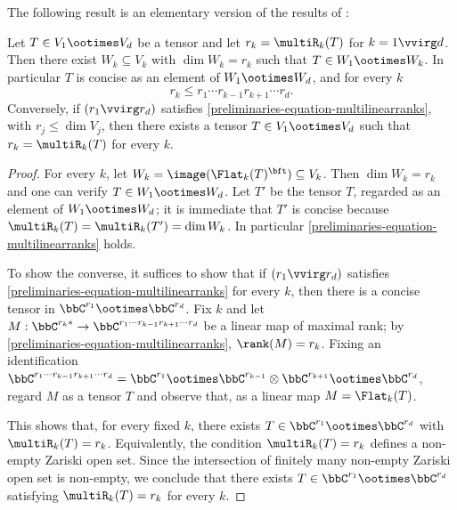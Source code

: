 The following result is an elementary version of the results of \cite{CK11}:
\begin{lemma}
\label{preliminaries-lemma-multilinearranksineq}
 Let $T \in V_1 \ootimes V_d$ be a tensor and let $r_k = \multiR_k(T)$ for $k=1 \vvirg d$. Then there exist $W_k \subseteq V_k$ with $\dim W_k = r_k$ such that $T \in W_1 \ootimes W_k$. In particular $T$ is concise as an element of $W_1 \ootimes W_d$, and for every $k$
 \begin{equation}
  \label{preliminaries-equation-multilinearranks}
 r_k \leq r_1 \cdots r_{k-1} r_{k+1} \cdots r_d.
 \end{equation}
Conversely, if $(r_1 \vvirg r_d)$ satisfies \ref{preliminaries-equation-multilinearranks}, with $r_j \leq \dim V_j$, then there exists a tensor $T \in V_1 \ootimes V_d$ such that $r_k = \multiR_k(T)$ for every $k$.
\end{lemma}
\begin{proof}
For every $k$, let $W_k = \image (  \Flat_k(T)^\bft ) \subseteq V_k$. Then $\dim W_k = r_k$ and one can verify $T \in W_1 \ootimes W_d$. Let $T'$ be the tensor $T$, regarded as an element of $W_1 \ootimes W_d$; it is immediate that $T'$ is concise because $\multiR_k(T) = \multiR_k(T') = \dim W_k$. In particular \ref{preliminaries-equation-multilinearranks} holds.

To show the converse, it suffices to show that if $(r_1 \vvirg r_d)$ satisfies \ref{preliminaries-equation-multilinearranks} for every $k$, then there is a concise tensor in $\bbC^{r_1} \ootimes \bbC^{r_d}$. Fix $k$ and let $M : \bbC^{r_k *} \to \bbC^{r_1 \cdots r_{k-1}r_{k+1} \cdots r_d}$ be a linear map of maximal rank; by \ref{preliminaries-equation-multilinearranks}, $\rank(M) = r_k$. Fixing an identification $\bbC^{r_1 \cdots r_{k-1}r_{k+1} \cdots r_d} = \bbC^{r_1} \ootimes \bbC^{r_{k-1}} \otimes \bbC^{r_{k+1}} \ootimes \bbC^{r_d}$, regard $M$ as a tensor $T$ and observe that, as a linear map $M = \Flat_k(T)$.

This shows that, for every fixed $k$, there exists $T \in \bbC^{r_1} \ootimes \bbC^{r_d}$ with $\multiR_k(T) = r_k$. Equivalently, the condition $\multiR_k(T) = r_k$ defines a non-empty Zariski open set. Since the intersection of finitely many non-empty Zariski open set is non-empty, we conclude that there exists $T \in \bbC^{r_1} \ootimes \bbC^{r_d}$ satisfying $\multiR_k(T) = r_k$ for every $k$. 
\end{proof}

